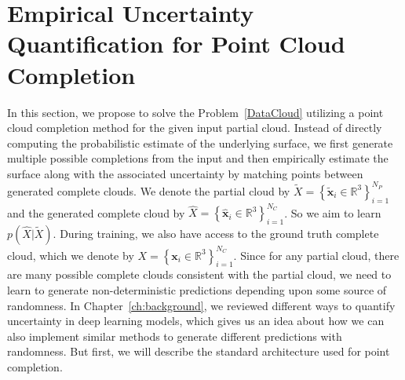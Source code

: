\section{Empirical Uncertainty Quantification for Point Cloud Completion}\label{euqpcc}
In this section, we propose to solve the Problem~\ref{DataCloud} utilizing a point cloud completion method for the given input partial cloud. Instead of directly computing the probabilistic estimate of the underlying surface, we first generate multiple possible completions from the input and then empirically estimate the surface along with the associated uncertainty by matching points between generated complete clouds. We denote the partial cloud by $\tilde{X}=\left\{\mathbf{\tilde{x}}_{i} \in \mathbb{R}^{3}\right\}_{i=1}^{N_P}$ and the generated complete cloud by $\hat{X}=\left\{\mathbf{\hat{x}}_{i} \in \mathbb{R}^{3}\right\}_{i=1}^{N_C}$. So we aim to learn $p(\hat{X}|\tilde{X})$. During training, we also have access to the ground truth complete cloud, which we denote by $X=\left\{\mathbf{x}_{i} \in \mathbb{R}^{3}\right\}_{i=1}^{N_C}$. Since for any partial cloud, there are many possible complete clouds consistent with the partial cloud, we need to learn to generate non-deterministic predictions depending upon some source of randomness. In Chapter~\ref{ch:background}, we reviewed different ways to quantify uncertainty in deep learning models, which gives us an idea about how we can also implement similar methods to generate different predictions with randomness. But first, we will describe the standard architecture used for point completion.


